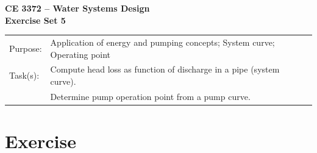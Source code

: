 \documentclass[12pt]{article}
\begin{document}
\begin{center}
{\textbf{{ CE 3372 -- Water Systems Design} \\ {Exercise Set 5}}}
\end{center}
\begingroup
\begin{tabular}{p{1in} p{5in}}
Purpose: & Application of energy and pumping concepts; System curve; Operating point\\
Task(s): & Compute head loss as function of discharge in a pipe (system curve). \\
~ & Determine pump operation point from a pump curve. \\
\end{tabular}
\endgroup
\section*{\small{Exercise}}
\end{document}
